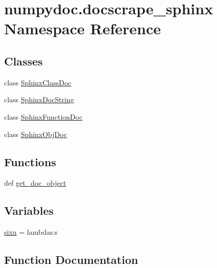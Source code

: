 \hypertarget{namespacenumpydoc_1_1docscrape__sphinx}{}\section{numpydoc.\+docscrape\+\_\+sphinx Namespace Reference}
\label{namespacenumpydoc_1_1docscrape__sphinx}
\subsection*{Classes}
\begin{DoxyCompactItemize}
\item 
class \hyperlink{classnumpydoc_1_1docscrape__sphinx_1_1SphinxClassDoc}{Sphinx\+Class\+Doc}
\item 
class \hyperlink{classnumpydoc_1_1docscrape__sphinx_1_1SphinxDocString}{Sphinx\+Doc\+String}
\item 
class \hyperlink{classnumpydoc_1_1docscrape__sphinx_1_1SphinxFunctionDoc}{Sphinx\+Function\+Doc}
\item 
class \hyperlink{classnumpydoc_1_1docscrape__sphinx_1_1SphinxObjDoc}{Sphinx\+Obj\+Doc}
\end{DoxyCompactItemize}
\subsection*{Functions}
\begin{DoxyCompactItemize}
\item 
def \hyperlink{namespacenumpydoc_1_1docscrape__sphinx_a22c98b4fffb9e46e7e514b3ad62b8d3b}{get\+\_\+doc\+\_\+object}
\end{DoxyCompactItemize}
\subsection*{Variables}
\begin{DoxyCompactItemize}
\item 
\hyperlink{namespacenumpydoc_1_1docscrape__sphinx_a47e44cfa5e5bd56dba9ded4bf3824afd}{sixu} = lambdas\+:s
\end{DoxyCompactItemize}


\subsection{Function Documentation}
\hypertarget{namespacenumpydoc_1_1docscrape__sphinx_a22c98b4fffb9e46e7e514b3ad62b8d3b}{}
